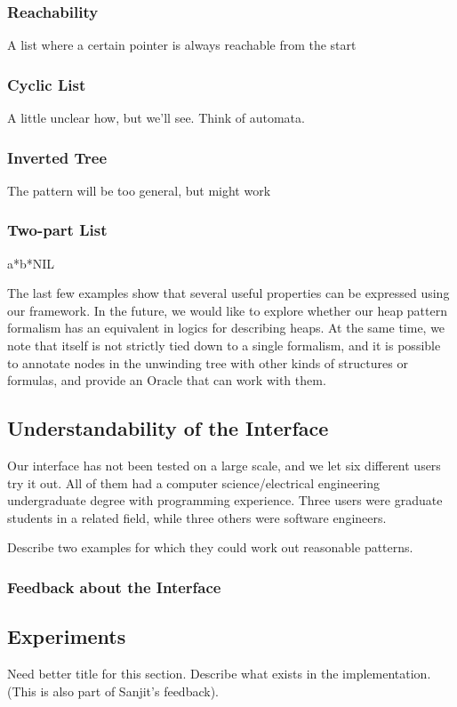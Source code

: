 \subsubsection{Reachability}
A list where a certain pointer is always reachable from the start

\subsubsection{Cyclic List}
A little unclear how, but we'll see. Think of automata.

\subsubsection{Inverted Tree}
The pattern will be too general, but might work

\subsubsection{Two-part List}
a*b*NIL

The last few examples show that several useful properties can be expressed using our framework. In the future, we would like to explore whether our heap pattern formalism has an equivalent in logics for describing heaps. At the same time, we note that \verifier itself is not strictly tied down to a single formalism, and it is possible to annotate nodes in the unwinding tree with other kinds of structures or formulas, and provide an Oracle that can work with them.

\subsection{Understandability of the Interface}
\label{sec:understandability-of-interface}
Our interface has not been tested on a large scale, and we let six different users try it out. All of them had a computer science/electrical engineering undergraduate degree with programming experience. Three users were graduate students in a related field, while three others were software engineers.

Describe two examples for which they could work out reasonable patterns.

\subsubsection{Feedback about the Interface}

\subsection{Experiments}
Need better title for this section. Describe what exists in the implementation. (This is also part of Sanjit's feedback).

